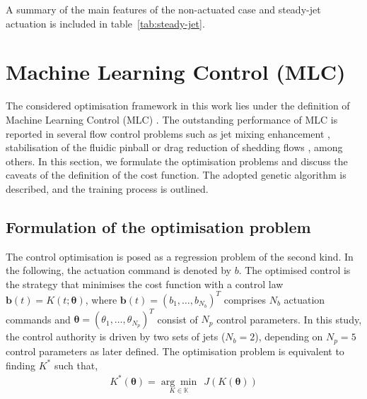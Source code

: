 A summary of the main features of the non-actuated case and steady-jet actuation is included in table~\ref{tab:steady-jet}.


%
\section{Machine Learning Control (MLC)}\label{s:MLC}

The considered optimisation framework in this work lies under the definition of Machine Learning Control (MLC) \citep{BruntonNoack2015review,duriez2017book}. The outstanding performance of MLC is reported in several flow control problems such as jet mixing enhancement \citep{Wu2018jet}, stabilisation of the fluidic pinball \citep{cornejo2021gMLC} or drag reduction of shedding flows \citep{Castellanos2022LGPCvsRL}, among others. In this section, we formulate the optimisation problems and discuss the caveats of the definition of the cost function. The adopted genetic algorithm is described, and the training process is outlined.


\subsection{Formulation of the optimisation problem}\label{ss:opt_problem}

The control optimisation is posed as a regression problem of the second kind. In the following, the actuation command is denoted by $b$. The optimised control is the strategy that minimises the cost function with a control law $\bm{b}(t) = {K}(t;\bm{\theta})$, where $\bm{b}(t) = (b_1, \ldots ,b_{N_b})^T$ comprises $N_b$ actuation commands and $\bm{\theta} = (\theta_1, \ldots , \theta_{N_p})^T$ consist of $N_p$ control parameters. In this study, the control authority is driven by two sets of jets ($N_b = 2$), depending on $N_p = 5$ control parameters as later defined. The optimisation problem is equivalent to finding ${K}^{*}$ such that,
%
\begin{equation}\label{eq:Optproblem}
    \begin{aligned}
        {K}^{*}(\bm{\theta}) = \underset{{K \in \mathbb{K}}}{\arg\min}~~ J({K}(\bm{\theta}))
    \end{aligned}
\end{equation}


